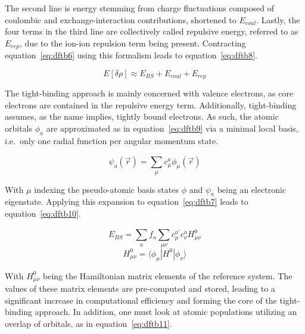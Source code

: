 \documentclass[11pt]{article}
\begin{document}
\noindent The second line is energy stemming from charge fluctuations composed of coulombic and exchange-interaction contributions, shortened to $E_{coul}$. 
Lastly, the four terms in the third line are collectively called repulsive energy, referred to as $E_{rep}$, due to the ion-ion repulsion term being present.
Contracting equation~\ref{eq:dftb6} using this formalism leads to equation~\ref{eq:dftb8}.

\begin{equation}
  E[\delta\rho] \approx E_{BS} + E_{coul} + E_{rep}
  \label{eq:dftb8}
\end{equation}

\bigskip

\noindent The tight-binding approach is mainly concerned with valence electrons, as core electrons are contained in the repulsive energy term.
Additionally, tight-binding assumes, as the name implies, tightly bound electrons.
As such, the atomic orbitals $\phi_a$ are approximated as in equation~\ref{eq:dftb9} via a minimal local basis, i.e.~only one radial function per angular momentum state.

\begin{equation}
  \psi_a(\vec{r}) = \sum_{\mu}^{}c_{\mu}^a\phi_{\mu}(\vec{r})
  \label{eq:dftb9}
\end{equation}

\bigskip

\noindent With $\mu$ indexing the pseudo-atomic basis states $\phi$ and $\psi_a$ being an electronic eigenstate.
Applying this expansion to equation~\ref{eq:dftb7} leads to equation~\ref{eq:dftb10}.

\begin{equation}
  E_{BS} = \sum_{a}^{} f_a \sum_{\mu\nu}^{}c_{\mu}^{a'} c_{\nu}^a H_{\mu\nu}^0
  \label{eq:dftb10}
\end{equation}
\begin{equation*}
  H^0_{\mu\nu} = \langle\phi_{\mu}|H^0|\phi_{\nu}\rangle
\end{equation*}

\bigskip

\noindent With $H^0_{\mu\nu}$ being the Hamiltonian matrix elements of the reference system.
The values of these matrix elements are pre-computed and stored, leading to a significant increase in computational efficiency and forming the core of the tight-binding approach.
In addition, one must look at atomic populations utilizing an overlap of orbitals, as in equation~\ref{eq:dftb11}.
\end{document}
